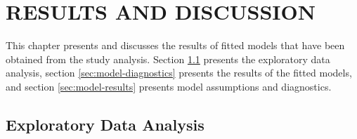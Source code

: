 
\chapter{RESULTS AND DISCUSSION}

This chapter presents and discusses the results of fitted models that have been obtained from the study analysis.
Section \ref{sec:eda} presents the exploratory data analysis, section \ref{sec:model-diagnostics} presents the results of the fitted models, and section \ref{sec:model-results} presents model assumptions and diagnostics.


\section{Exploratory Data Analysis} \label{sec:eda}

\hspace*{0.5pt}
\addtocounter{table}{-1}

